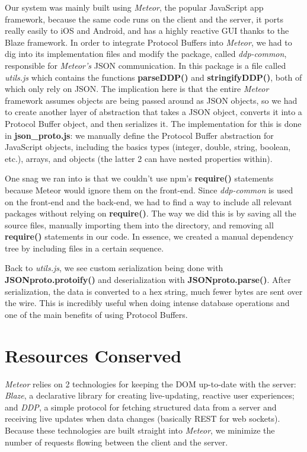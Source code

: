 \documentclass[a4paper, 11pt]{article} %
\begin{document}
Our system was mainly built using \textit{Meteor}, the popular JavaScript app framework, because the same code runs on the client and the server, it ports really easily to iOS and Android, and has a highly reactive GUI thanks to the Blaze framework. In order to integrate Protocol Buffers into \textit{Meteor}, we had to dig into its implementation files and modify the package, called \textit{ddp-common}, responsible for \textit{Meteor's} JSON communication. In this package is a file called \textit{utils.js} which contains the functions \textbf{parseDDP()} and \textbf{stringifyDDP()}, both of which only rely on JSON. The implication here is that the entire \textit{Meteor} framework assumes objects are being passed around as JSON objects, so we had to create another layer of abstraction that takes a JSON object, converts it into a Protocol Buffer object, and then serializes it. The implementation for this is done in \textbf{json\_proto.js}: we manually define the Protocol Buffer abstraction for JavaScript objects, including the basics types (integer, double, string, boolean, etc.), arrays, and objects (the latter 2 can have nested properties within). 

One snag we ran into is that we couldn't use npm's \textbf{require()} statements because Meteor would ignore them on the front-end. Since \textit{ddp-common} is used on the front-end and the back-end, we had to find a way to include all relevant packages without relying on \textbf{require()}. The way we did this is by saving all the source files, manually importing them into the directory, and removing all \textbf{require()} statements in our code. In essence, we created a manual dependency tree by including files in a certain sequence. 

Back to \textit{utils.js}, we see custom serialization being done with \textbf{JSONproto.protoify()} and deserialization with \textbf{JSONproto.parse()}. After serialization, the data is converted to a hex string, much fewer bytes are sent over the wire. This is incredibly useful when doing intense database operations and one of the main benefits of using Protocol Buffers.

\section*{Resources Conserved}

\textit{Meteor} relies on 2 technologies for keeping the DOM up-to-date with the server: \textit{Blaze}, a declarative library for creating live-updating, reactive user experiences; and \textit{DDP}, a simple protocol for fetching structured data from a server and receiving live updates when data changes (basically REST for web sockets). Because these technologies are built straight into \textit{Meteor}, we minimize the number of requests flowing between the client and the server.
\end{document}
